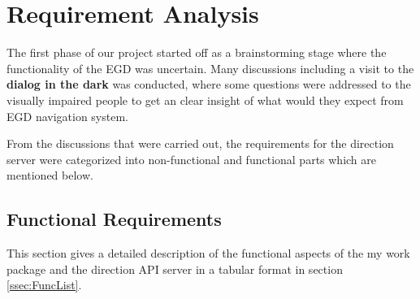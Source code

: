 \newpage
\chapter{Requirement Analysis}
    The first phase of our project started off as a brainstorming stage where the functionality
    of the EGD was uncertain. Many discussions including a visit to the \textbf{dialog in the dark} 
    was conducted, where some questions were addressed to the visually impaired people to get an clear insight
    of what would they expect from EGD navigation system. 
\par
    From the discussions that were carried out, the requirements for the direction server were
    categorized into non-functional and functional parts which are mentioned below.
    
    \section{Functional Requirements}
        This section gives a detailed description of the functional aspects of the my work package %
        and the direction API server in a tabular format in section \ref{ssec:FuncList}.
